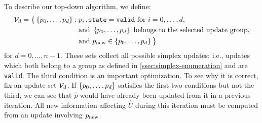\documentclass[eikonal.tex]{subfiles}
\begin{document}
To describe our top-down algorithm, we define:
\begin{equation}\label{eq:calU}
  \begin{aligned}
    \calV_d = \big\{\set{p_0, \hdots, p_d}: \; &p_i\texttt{.state}=\texttt{valid} \mbox{ for } i = 0, \hdots, d, \\
    &\mbox{and } \set{p_0, \hdots, p_d} \mbox{ belongs to the selected update group}, \\
    &\mbox{and } \pnew \in \set{p_0, \hdots, p_d} \big\}
  \end{aligned}
\end{equation}
for $d = 0, \hdots, n - 1$. These sets collect all possible simplex
updates: i.e., updates which both belong to a group as defined in
\cref{ssec:simplex-enumeration} and are \texttt{valid}. The third
condition is an important optimization. To see why it is correct, fix
an update set $\mathcal{V}_d$. If $\left\{p_0, \hdots, p_d\right\}$ satisfies the
first two conditions but not the third, we can see that $\hat{p}$
would have already been updated from it in a previous iteration. All
new information affecting $\hat{U}$ during this iteration must be
computed from an update involving $p_{\operatorname{new}}$.
\end{document}
